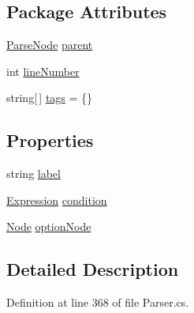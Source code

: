 \subsection*{Package Attributes}
\begin{DoxyCompactItemize}
\item 
\hyperlink{a00138}{Parse\-Node} \hyperlink{a00138_af313a82103fcc2ff5a177dbb06b92f7b}{parent}
\item 
int \hyperlink{a00138_a18b493382de0fde5b4299c1bd2250075}{line\-Number}
\item 
string\mbox{[}$\,$\mbox{]} \hyperlink{a00138_a58b3a15788fd2d4127d73619dc6d04ae}{tags} = \{\}
\end{DoxyCompactItemize}
\subsection*{Properties}
\begin{DoxyCompactItemize}
\item 
string \hyperlink{a00149_ab43ec731479a56891389f6ece87f5f62}{label}
\item 
\hyperlink{a00094}{Expression} \hyperlink{a00149_a31ece7f65af1e43961b68ba0275cdfaf}{condition}
\item 
\hyperlink{a00128}{Node} \hyperlink{a00149_a33d667370031f58b054b79a39891c3f3}{option\-Node}
\end{DoxyCompactItemize}


\subsection{Detailed Description}


Definition at line 368 of file Parser.\-cs.



